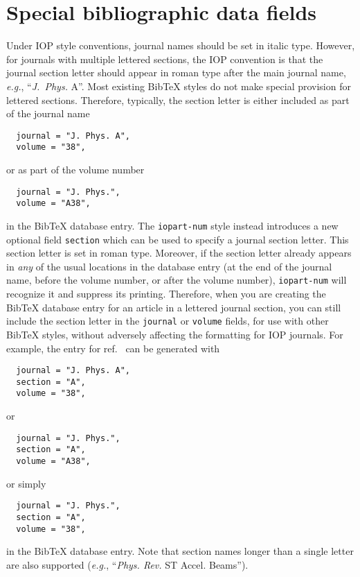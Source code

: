 \documentclass[12pt]{iopart}
\newcommand{\BibTeX}{Bib\TeX}
\begin{document}
\section{Special bibliographic data fields}

Under IOP style conventions, journal names should be set in italic
type.  However, for journals with multiple lettered sections, the IOP
convention is that the journal section letter should appear in roman
type after the main journal name, \textit{e.g.}, ``\textit{J.\
Phys.\/} A''.  Most existing \BibTeX{} styles do not make special
provision for lettered sections.  Therefore, typically, the section
letter is either included as part of the journal name
\begin{verbatim}
  journal = "J. Phys. A",
  volume = "38",
\end{verbatim}
or as part of the volume number
\begin{verbatim}
  journal = "J. Phys.",
  volume = "A38",
\end{verbatim}
in the \BibTeX{} database entry.  The \texttt{iopart-num} style
instead introduces a new optional field \verb+section+ which can be
used to specify a journal section letter.  This section letter is set in
roman type.  Moreover, if the section letter already appears in
\textit{any} of the usual locations in the database entry (at the end
of the journal name, before the volume number, or after the volume
number),
\texttt{iopart-num} will recognize it and suppress its printing.
Therefore, when you are creating the
\BibTeX{} database entry for an article in a lettered journal section,
you can still include the section letter in the \verb+journal+ or
\verb+volume+ fields, for use with other \BibTeX{} styles, 
without adversely affecting the formatting for IOP journals.  For
example, the entry for ref.~\cite{caprio2005:coherent} can be
generated with
\begin{verbatim}
  journal = "J. Phys. A",
  section = "A",
  volume = "38",
\end{verbatim}
or
\begin{verbatim}
  journal = "J. Phys.",
  section = "A",
  volume = "A38",
\end{verbatim}
or simply
\begin{verbatim}
  journal = "J. Phys.",
  section = "A",
  volume = "38",
\end{verbatim}
in the \BibTeX{} database entry.  Note that section names longer than a
single letter are also supported (\textit{e.g.},
``\textit{Phys. Rev.\/} ST Accel. Beams'').
\end{document}
